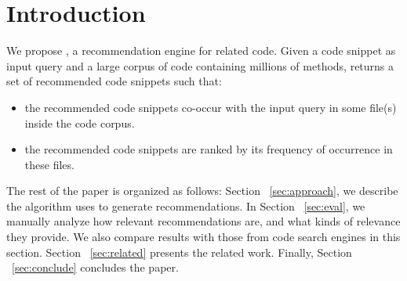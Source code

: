 \section{Introduction}
\label{sec:intro}



We propose {\tool}, a recommendation engine for related code. Given a code snippet as input query and a large corpus of code containing millions of methods, {\tool} returns a set of recommended code snippets such that:
\begin{itemize}
	\item the recommended code snippets co-occur with the input query in some file(s) inside the code corpus.
	\item the recommended code snippets are ranked by its frequency of occurrence in these files.
\end{itemize}


The rest of the paper is organized as follows: Section ~\ref{sec:approach}, we describe the algorithm {\tool} uses to generate recommendations. In Section ~\ref{sec:eval}, we manually analyze how relevant {\tool} recommendations are, and what kinds of relevance they provide. We also compare {\tool} results with those from code search engines in this section. Section ~\ref{sec:related} presents the related work. Finally, Section ~\ref{sec:conclude} concludes the paper.